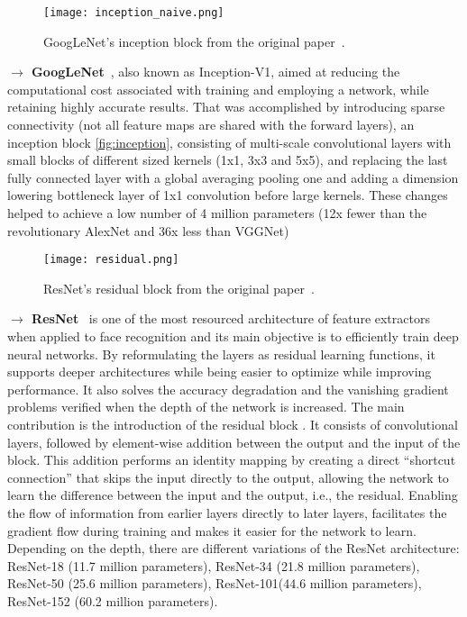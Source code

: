 \documentclass[class=report, crop=false, a4paper, 12pt]{standalone}
\begin{document}
\begin{figure}[H]
    \centering
    \texttt{[image: inception\_naive.png]}
    \caption{GoogLeNet's inception block from the original paper~\autocite{szegedyGoingDeeperConvolutions2014}.}
    \label{fig:inception}
\end{figure}

\noindent\textbf{$\rightarrow$ GoogLeNet}~\autocite{szegedyGoingDeeperConvolutions2014}, also known as Inception-V1, aimed at reducing the computational cost associated with training and employing a network, while retaining highly accurate results. That was accomplished by introducing sparse connectivity (not all feature maps are shared with the forward layers), an inception block \autoref{fig:inception}, consisting of multi-scale convolutional layers with small blocks of different sized kernels (1x1, 3x3 and 5x5), and replacing the last fully connected layer with a global averaging pooling one and adding a dimension lowering bottleneck layer of 1x1 convolution before large kernels. These changes helped to achieve a low number of 4 million parameters (12x fewer than the revolutionary AlexNet and 36x less than VGGNet)

\vspace{0.7\baselineskip}
\begin{figure}[H]
    \centering
    \texttt{[image: residual.png]}
    \caption{ResNet's residual block from the original paper~\autocite{heDeepResidualLearning2016}.}
    \label{fig:residual}
\end{figure}

\vspace{0.7\baselineskip}
\label{sec:resnet}
\noindent\textbf{$\rightarrow$ ResNet}~\autocite{heDeepResidualLearning2016} is one of the most resourced architecture of feature extractors when applied to face recognition and its main objective is to efficiently train deep neural networks. By reformulating the layers as residual learning functions, it supports deeper architectures while being easier to optimize while improving performance. It also solves the accuracy degradation and the vanishing gradient problems verified when the depth of the network is increased. The main contribution is the introduction of the residual block . It consists of convolutional layers, followed by element-wise addition between the output and the input of the block. This addition performs an identity mapping by creating a direct ``shortcut connection'' that skips the input directly to the output, allowing the network to learn the difference between the input and the output, i.e., the residual. Enabling the flow of information from earlier layers directly to later layers, facilitates the gradient flow during training and makes it easier for the network to learn. Depending on the depth, there are different variations of the ResNet architecture: ResNet-18 (11.7 million parameters), ResNet-34 (21.8 million parameters), ResNet-50 (25.6 million parameters), ResNet-101(44.6 million parameters), ResNet-152 (60.2 million parameters).
\end{document}
